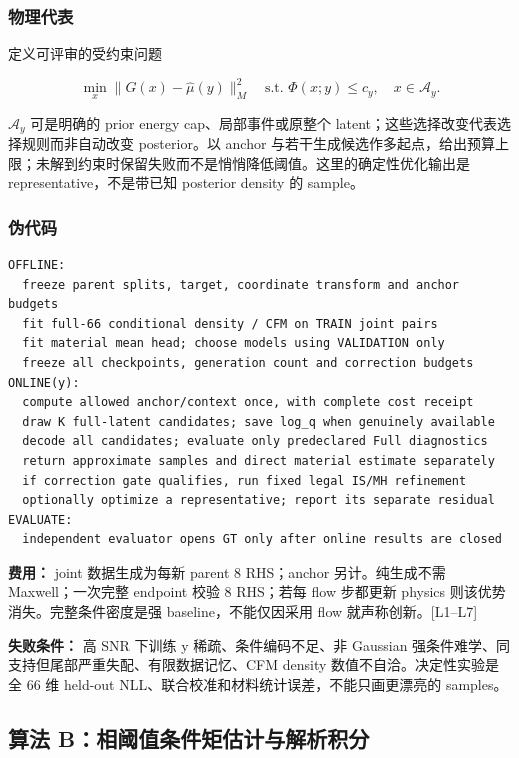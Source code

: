 \documentclass[
  11pt,
  a4paper,
]{article}
\begin{document}
\hypertarget{ux7269ux7406ux4ee3ux8868}{%
\subsubsection{物理代表}\label{ux7269ux7406ux4ee3ux8868}}

定义可评审的受约束问题

\[\min_x\|G(x)-\widehat\mu(y)\|_M^2
\quad\text{s.t. }\Phi(x;y)\le c_y,\quad x\in\mathcal{A}_y.\]

\(\mathcal{A}_y\) 可是明确的 prior energy cap、局部事件或原整个
latent；这些选择改变代表选择规则而非自动改变 posterior。以 anchor
与若干生成候选作多起点，给出预算上限；未解到约束时保留失败而不是悄悄降低阈值。这里的确定性优化输出是
representative，不是带已知 posterior density 的 sample。

\hypertarget{ux4f2aux4ee3ux7801}{%
\subsubsection{伪代码}\label{ux4f2aux4ee3ux7801}}

\begin{verbatim}
OFFLINE:
  freeze parent splits, target, coordinate transform and anchor budgets
  fit full-66 conditional density / CFM on TRAIN joint pairs
  fit material mean head; choose models using VALIDATION only
  freeze all checkpoints, generation count and correction budgets
ONLINE(y):
  compute allowed anchor/context once, with complete cost receipt
  draw K full-latent candidates; save log_q when genuinely available
  decode all candidates; evaluate only predeclared Full diagnostics
  return approximate samples and direct material estimate separately
  if correction gate qualifies, run fixed legal IS/MH refinement
  optionally optimize a representative; report its separate residual
EVALUATE:
  independent evaluator opens GT only after online results are closed
\end{verbatim}

\textbf{费用：} joint 数据生成为每新 parent 8 RHS；anchor
另计。纯生成不需 Maxwell；一次完整 endpoint 校验 8 RHS；若每 flow
步都更新 physics 则该优势消失。完整条件密度是强 baseline，不能仅因采用
flow 就声称创新。{[}L1--L7{]}

\textbf{失败条件：} 高 SNR 下训练 y 稀疏、条件编码不足、非 Gaussian
强条件难学、同支持但尾部严重失配、有限数据记忆、CFM density
数值不自洽。决定性实验是全 66 维 held-out
NLL、联合校准和材料统计误差，不能只画更漂亮的 samples。

\hypertarget{ux7b97ux6cd5-bux76f8ux9608ux503cux6761ux4ef6ux77e9ux4f30ux8ba1ux4e0eux89e3ux6790ux79efux5206}{%
\subsection{算法
B：相阈值条件矩估计与解析积分}\label{ux7b97ux6cd5-bux76f8ux9608ux503cux6761ux4ef6ux77e9ux4f30ux8ba1ux4e0eux89e3ux6790ux79efux5206}}
\end{document}
